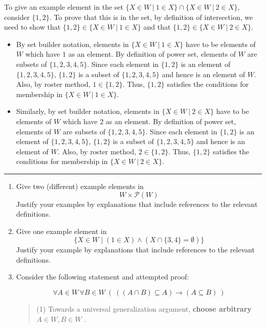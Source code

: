 \documentclass[12pt, oneside]{article}
\begin{document}
\begin{enumerate}[labelindent=0pt, leftmargin=0pt]
    To give an example element in the set 
    $\{ X \in W ~|~ 1 \in X \} \cap \{ X \in W ~|~  2 \in X \}$,
    consider $\{ 1,2\}$. To prove that this is in the set, by definition of intersection, we need to show
    that $\{1,2\} \in \{ X \in W ~|~ 1 \in X \}$ and that $\{1,2\} \in \{ X \in W ~|~ 2 \in X \}$.
    \begin{itemize}
    \item By set builder notation, elements in $\{ X \in W ~|~ 1 \in X \}$ have to be elements of $W$ which have $1$ as an element. By definition of power set, elements of $W$ are subsets of $\{1,2,3,4,5\}$. Since
    each element in $\{1,2\}$ is an element of $\{1,2,3,4,5\}$, $\{1,2\}$ is a subset of $\{1,2,3,4,5\}$ 
    and hence is an element of $W$. Also, by roster method, $1 \in \{1,2\}$. Thus, $\{1,2\}$ satisfies the 
    conditions for membership in $\{ X \in W ~|~ 1 \in X \}$.
    \item Similarly, by set builder notation, elements in $\{ X \in W ~|~ 2 \in X \}$ have to be elements of $W$ 
    which have $2$ as an element. 
    By definition of power set, elements of $W$ are subsets of $\{1,2,3,4,5\}$. Since
    each element in $\{1,2\}$ is an element of $\{1,2,3,4,5\}$, $\{1,2\}$ is a subset of $\{1,2,3,4,5\}$ 
    and hence is an element of $W$. Also, by roster method, $2 \in \{1,2\}$. Thus, $\{1,2\}$ satisfies the 
    conditions for membership in $\{ X \in W ~|~ 2 \in X \}$.
    \end{itemize}
    
    \rule{0.5\textwidth}{.4pt}
    
    
    \begin{enumerate}
    \item Give two (different) example elements in 
    \[
    W \times \mathcal{P}(W)
    \]
    Justify your examples by explanations that include references to the relevant definitions.
    
    \item Give one example element in 
    \[
    \{ X \in W \mid (1 \in X) \land (X \cap \{3,4\} = \emptyset) \}
    \]
    Justify your example by explanations that include references to the relevant definitions.
    
    \item Consider the following statement and attempted proof:
    
    
    $$\forall A \in W \, \forall B \in W ~\left(~((A \cap B) \subseteq A) \to (A \subseteq B)~\right)$$
    
    \begin{quote}
    (1) Towards a universal generalization argument, {\bf choose arbitrary} $A \in W, B \in W$ .
    

\end{quote}
\end{enumerate}
\end{enumerate}
\end{document}
